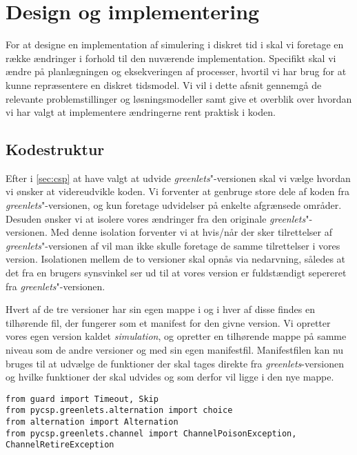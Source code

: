 
\section{Design og implementering}
For at designe en implementation af simulering i diskret tid i \pycsp skal vi foretage en række ændringer i forhold til den nuværende implementation. Specifikt skal vi ændre på planlægningen og eksekveringen af processer, hvortil vi har brug for at kunne repræsentere en diskret tidsmodel. Vi vil i dette afsnit gennemgå de relevante problemstillinger og løsningsmodeller samt give et overblik over hvordan vi har valgt at implementere ændringerne rent praktisk i koden. 


\subsection{Kodestruktur}  
Efter i \cref{sec:csp} at have valgt at udvide \emph{greenlets}"-versionen skal vi vælge hvordan vi ønsker at videreudvikle koden. Vi forventer at genbruge store dele af koden fra \emph{greenlets}"-versionen, og kun foretage udvidelser på enkelte afgrænsede områder. Desuden ønsker vi at isolere vores ændringer fra den originale \emph{greenlets}"-versionen. Med denne isolation forventer vi at hvis/når der sker tilrettelser af \emph{greenlets}"-versionen af \pycsp vil man ikke skulle foretage de samme tilrettelser i vores version. 
Isolationen mellem de to versioner skal opnås via nedarvning, således at det fra en brugers synsvinkel ser ud til at vores version er fuldstændigt sepereret fra \emph{greenlets}"-versionen.

Hvert af de tre versioner har sin egen mappe i \pycsp og i hver af disse findes en tilhørende  fil, der fungerer som et manifest for den givne version. Vi opretter vores egen version kaldet \emph{simulation}, og opretter en tilhørende mappe på samme niveau som de andre versioner og med sin egen manifestfil. Manifestfilen kan nu bruges til at udvælge de funktioner der skal tages direkte fra \emph{greenlets}-versionen og hvilke funktioner der skal udvides og som derfor vil ligge i den nye mappe.
\begin{lstlisting}[float=hbtp,label=fig:init,caption=Uddrag af \code{\_\_init\_\_.py} for simulationsversionen.]
from guard import Timeout, Skip
from pycsp.greenlets.alternation import choice
from alternation import Alternation
from pycsp.greenlets.channel import ChannelPoisonException, ChannelRetireException
\end{lstlisting}

